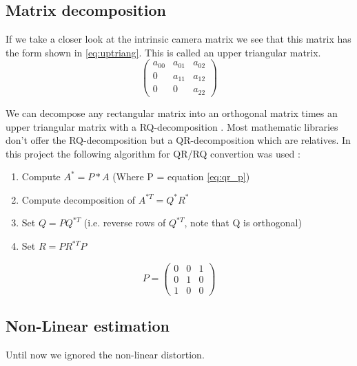 \documentclass[11pt,a4paper,titlepage,oneside]{report}
\begin{document}
\subsection{Matrix decomposition}
If we take a closer look at the intrinsic camera matrix we see that this matrix has the form shown in \ref{eq:uptriang}. This is called an upper triangular matrix.
\begin{equation}\label{eq:uptriang}
	\begin{pmatrix}
		a_{00} & a_{01} & a_{02}\\
		0 & a_{11} & a_{12}\\
		0 & 0 & a_{22}
	\end{pmatrix}
\end{equation}

We can decompose any rectangular matrix into an orthogonal matrix times an upper triangular matrix with a RQ-decomposition \cite{qr_decomposition}. Most mathematic libraries don't offer the RQ-decomposition but a QR-decomposition which are relatives. In this project the following algorithm for QR/RQ convertion was used \cite{rq_stack}:
\begin{enumerate}
	\item Compute $A^{*}=P*A$ (Where P = equation \ref{eq:qr_p})
	\item Compute decomposition of $A^{*T}=Q^*R^*$
	\item Set $Q=PQ^{*T}$ (i.e. reverse rows of $Q^{*T}$, note that Q is orthogonal)
	\item Set $R=PR^{*T}P$
\end{enumerate}

\begin{equation}\label{eq:qr_p}
	P=\begin{pmatrix}
		0 & 0 & 1\\
		0 & 1 & 0\\
		1 & 0 & 0
	\end{pmatrix}
\end{equation}

\subsection{Non-Linear estimation}
Until now we ignored the non-linear distortion. 
\end{document}
